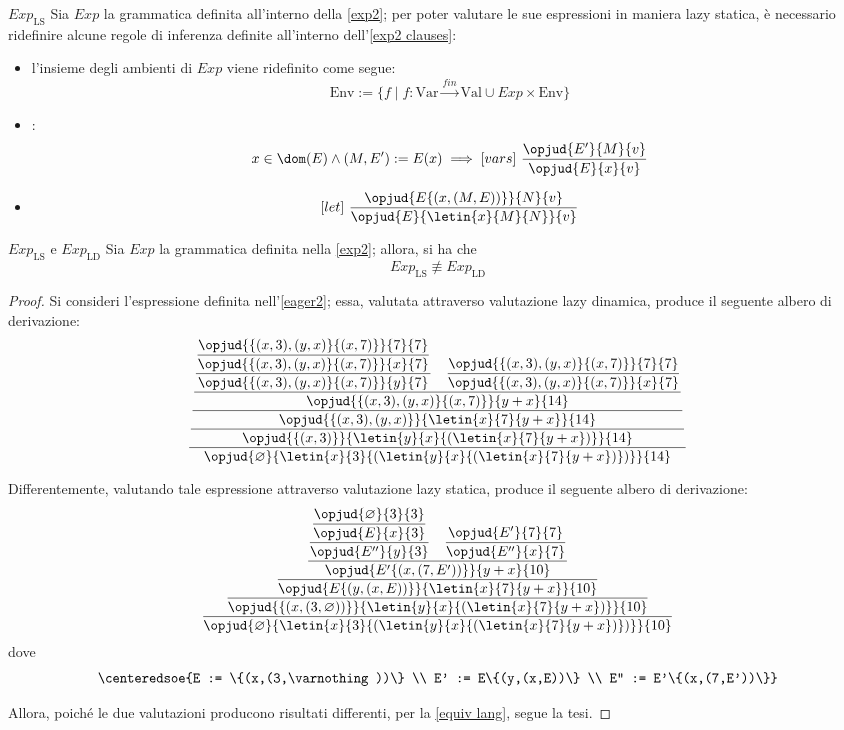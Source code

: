 \documentclass[a4paper, 12pt]{report}
\begin{document}
    \begin{framedprop}[breakable]{$Exp_\mathrm{LS}$}
        Sia $Exp$ la grammatica definita all'interno della \cref{exp2}; per poter valutare le sue espressioni in maniera lazy statica, è necessario ridefinire alcune regole di inferenza definite all'interno dell'\cref{exp2 clauses}:

        \begin{itemize}
            \item l'insieme degli ambienti di $Exp$ viene ridefinito come segue: $$\mathrm{Env} := \{f \mid f: \mathrm{Var} \xrightarrow{fin} \mathrm{Val} \cup Exp \times \mathrm{Env} \}$$
            \item {}: $$x \in \dom(E) \land (M, E') := E(x) \implies [vars] \ \dfrac{\opjud{E'}{M}{v}}{\opjud{E}{x}{v}}$$
            \item {} $$[let] \ \dfrac{\opjud{E\{(x, (M, E))\}}{N}{v}}{\opjud{E}{\letin{x}{M}{N}}{v}}$$
        \end{itemize}
    \end{framedprop}

    \begin{framedlem}{$Exp_\mathrm{LS}$ e $Exp_\mathrm{LD}$}
        Sia $Exp$ la grammatica definita nella \cref{exp2}; allora, si ha che $$Exp_\mathrm{LS} \not\equiv Exp_\mathrm{LD}$$
    \end{framedlem}

    \begin{proof}
        Si consideri l'espressione definita nell'\cref{eager2}; essa, valutata attraverso valutazione lazy dinamica, produce il seguente albero di derivazione: $$\dfrac{\dfrac{\dfrac{\dfrac{\dfrac{\dfrac{\opjud{\{(x,3),(y,x)\}\{(x,7)\}}{7}{7}}{\opjud{\{(x,3),(y,x)\}\{(x,7)\}}{x}{7}}}{\opjud{\{(x,3),(y,x)\}\{(x,7)\}}{y}{7}} \quad \dfrac{\opjud{\{(x,3),(y,x)\}\{(x,7)\}}{7}{7}}{\opjud{\{(x,3),(y,x)\}\{(x,7)\}}{x}{7}}}{\opjud{\{(x,3),(y,x)\}\{(x,7)\}}{y+x}{14}}}{\opjud{\{(x,3),(y,x)\}}{\letin{x}{7}{y+x}}{14}}}{\opjud{\{(x,3)\}}{\letin{y}{x}{(\letin{x}{7}{y+x})}}{14}}}{\opjud{\varnothing}{\letin{x}{3}{(\letin{y}{x}{(\letin{x}{7}{y+x})})}}{14}}$$

        Differentemente, valutando tale espressione attraverso valutazione lazy statica, produce il seguente albero di derivazione: $$\dfrac{\dfrac{\dfrac{\dfrac{\dfrac{\dfrac{\opjud{\varnothing}{3}{3}}{\opjud{E}{x}{3}}}{\opjud{E''}{y}{3}} \quad \dfrac{\opjud{E'}{7}{7}}{\opjud{E''}{x}{7}}}{\opjud{E'\{(x,(7,E'))\}}{y+x}{10}}}{\opjud{E\{(y,(x, E))\}}{\letin{x}{7}{y+x}}{10}}}{\opjud{\{(x,(3,\varnothing))\}}{\letin{y}{x}{(\letin{x}{7}{y+x})}}{10}}}{\opjud{\varnothing}{\letin{x}{3}{(\letin{y}{x}{(\letin{x}{7}{y+x})})}}{10}}$$ dove $$\centeredsoe{E := \{(x,(3,\varnothing))\} \\ E' := E\{(y,(x,E))\} \\ E'' := E'\{(x,(7,E'))\}}$$

        Allora, poiché le due valutazioni producono risultati differenti, per la \cref{equiv lang}, segue la tesi.
    \end{proof}
\end{document}
